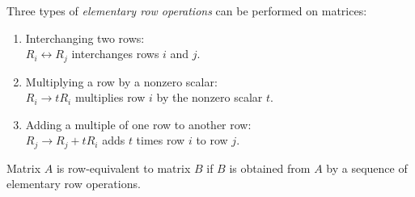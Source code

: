\documentclass[../main.tex]{subfiles}
\begin{document}
\begin{definition}
	\label{defn:defn_2_1}
	 Three types of \emph{elementary row operations} can be performed on matrices:
	\begin{enumerate}[label = \textbf{\arabic*.}, noitemsep]
		\item Interchanging two rows:\\
		$R_{i} \leftrightarrow R_{j}$ interchanges rows $i$ and $j .$
		\item Multiplying a row by a nonzero scalar:\\
		$R_{i} \rightarrow t R_{i}$ multiplies row $i$ by the nonzero scalar $t .$
		\item Adding a multiple of one row to another row:\\
		$R_{j} \rightarrow R_{j}+t R_{i}$ adds $t$ times row $i$ to row $j .$
	\end{enumerate}
\end{definition}

\begin{definition}
	\label{defn:defn_2_2}
	Matrix $A$ is row-equivalent to matrix $B$ if $B$ is obtained from $A$ by a sequence of elementary row operations.
\end{definition}
\end{document}
